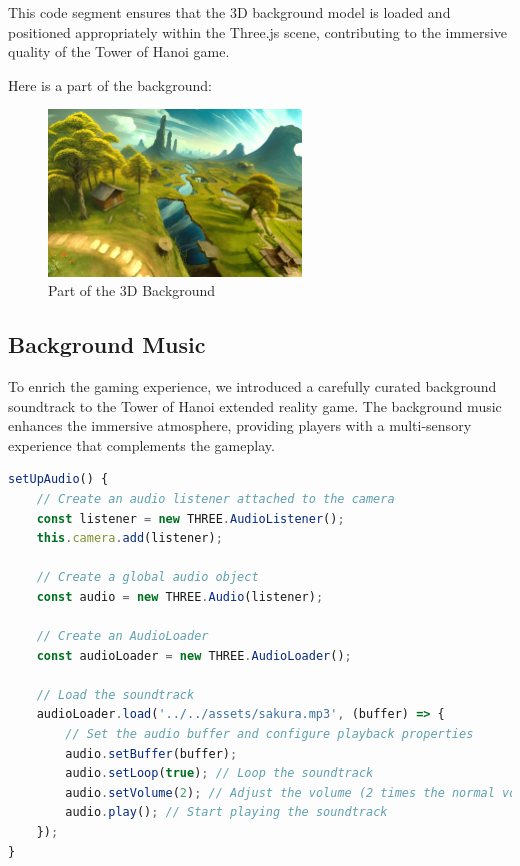 \documentclass{article}
\begin{document}
This code segment ensures that the 3D background model is loaded and positioned appropriately within the Three.js scene, contributing to the immersive quality of the Tower of Hanoi game.

Here is a part of the background:
\begin{figure}[h]
    \centering
    \includegraphics[width=0.6\textwidth]{img/back.png}
    \caption{Part of the 3D Background}
    \label{fig:back}
\end{figure}


\subsection{Background Music}

To enrich the gaming experience, we introduced a carefully curated background soundtrack to the Tower of Hanoi extended reality game. The background music enhances the immersive atmosphere, providing players with a multi-sensory experience that complements the gameplay.

\begin{lstlisting}[language=JavaScript, caption={JS code for adding Audio}]
setUpAudio() {
    // Create an audio listener attached to the camera
    const listener = new THREE.AudioListener();
    this.camera.add(listener);

    // Create a global audio object
    const audio = new THREE.Audio(listener);

    // Create an AudioLoader
    const audioLoader = new THREE.AudioLoader();

    // Load the soundtrack
    audioLoader.load('../../assets/sakura.mp3', (buffer) => {
        // Set the audio buffer and configure playback properties
        audio.setBuffer(buffer);
        audio.setLoop(true); // Loop the soundtrack
        audio.setVolume(2); // Adjust the volume (2 times the normal volume)
        audio.play(); // Start playing the soundtrack
    });
}
\end{lstlisting}
\end{document}
